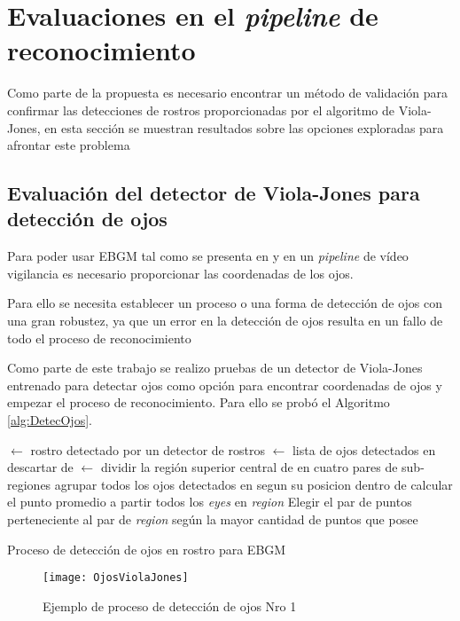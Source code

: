 \section{Evaluaciones en el \textit{pipeline} de reconocimiento}
Como parte de la propuesta es necesario encontrar un método de validación para confirmar las detecciones de rostros proporcionadas por el algoritmo de Viola-Jones, en esta sección se muestran resultados sobre las opciones exploradas para afrontar este problema

\subsection{Evaluación del detector de Viola-Jones para detección de ojos}\label{sscc:DectOjos}
Para poder usar \ac{EBGM} tal como se presenta en \cite{bolme2003elastic} y \cite{wiskott1997face} en un \textit{pipeline} de vídeo vigilancia es necesario proporcionar las coordenadas de los ojos.

Para ello se necesita establecer un proceso o una forma de detección de ojos con una gran robustez, ya que un error en la detección de ojos resulta en un fallo de todo el proceso de reconocimiento

Como parte de este trabajo se realizo pruebas de un detector de Viola-Jones entrenado para detectar ojos como opción para encontrar coordenadas de ojos y empezar el proceso de reconocimiento. Para ello se probó el Algoritmo \ref{alg:DetecOjos}.

\begin{algorithm}
 $\gets$ rostro detectado por un detector de rostros\;
 $\gets$ lista de ojos detectados en \;
{
    {
    	descartar  de \;
    }
}
 $\gets$ dividir la región superior central de  en cuatro pares de sub-regiones \;
agrupar todos los ojos detectados en  segun su posicion dentro de \;
{
	calcular el punto promedio a partir todos los \textit{eyes} en  \textit{region}\;
}
Elegir el par de puntos perteneciente al par de \textit{region} según la mayor cantidad de puntos que posee\;
\caption{Proceso de detección de ojos en rostro para \ac{EBGM}}
\label{alg:DetecOjos}
\end{algorithm}

\begin{figure}[h]
	\centering
	\texttt{[image: OjosViolaJones]}
    \caption{Ejemplo de proceso de detección de ojos Nro 1}
    \label{im:HaarOjos1}
\end{figure}

